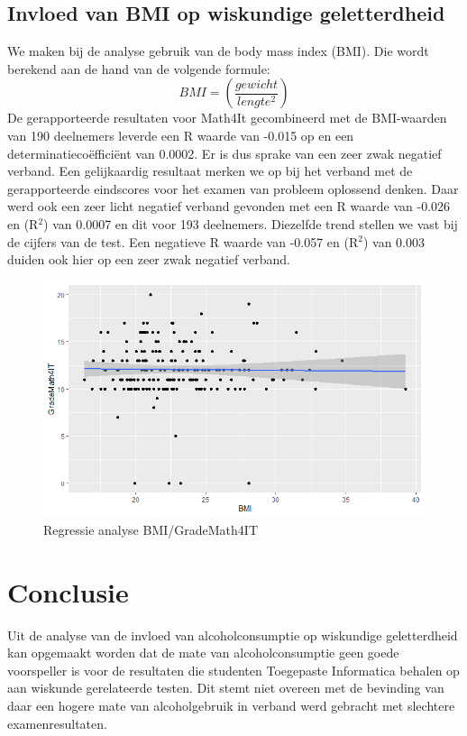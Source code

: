 \documentclass{hogent-article}
\begin{document}
\subsection{Invloed van BMI op wiskundige geletterdheid}
We maken bij de analyse gebruik van de body mass index (BMI). Die wordt berekend aan de hand van de volgende formule: \[ BMI = \left(\frac{gewicht}{lengte^2}\right) \] De gerapporteerde resultaten voor Math4It gecombineerd met de BMI-waarden van 190 deelnemers leverde een R waarde van -0.015 op en een determinatiecoëfficiënt van 0.0002. Er is dus sprake van een zeer zwak negatief verband. Een gelijkaardig resultaat merken we op bij het verband met de gerapporteerde eindscores voor het examen van probleem oplossend denken. Daar werd ook een zeer licht negatief verband gevonden met een R waarde van -0.026 en (R$^{2}$) van 0.0007 en dit voor 193 deelnemers. Diezelfde trend stellen we vast bij de cijfers van de test. Een negatieve R waarde van -0.057 en (R$^{2}$) van 0.003 duiden ook hier op een zeer zwak negatief verband.


\begin{figure}[ht]
    \begin{center}
        \includegraphics[width=\columnwidth]{BMIMath4IT.png}
    \end{center}
    \caption{Regressie analyse BMI/GradeMath4IT}
    \label{Regressie analyse BMI/GradeMath4IT}
\end{figure}

\section{Conclusie}
Uit de analyse van de invloed van alcoholconsumptie op wiskundige geletterdheid kan opgemaakt worden dat de mate van alcoholconsumptie geen goede voorspeller is voor de resultaten die studenten Toegepaste Informatica behalen op aan wiskunde gerelateerde testen. Dit stemt niet overeen met de bevinding van \textcite{Dielens2013} daar een hogere mate van alcoholgebruik in verband werd gebracht met slechtere examenresultaten.
\end{document}
